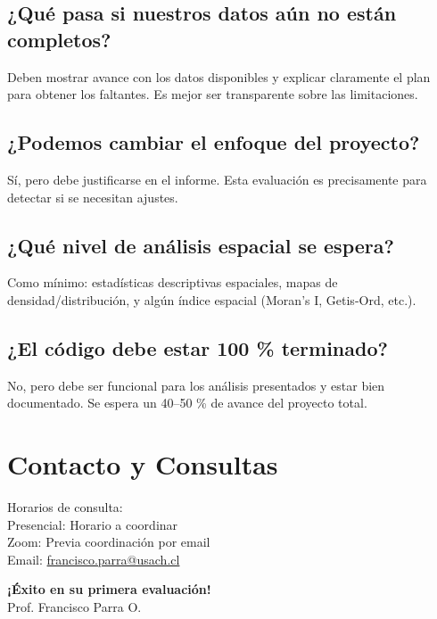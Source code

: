 \documentclass[11pt,a4paper]{article}
\begin{document}
\subsection{¿Qué pasa si nuestros datos aún no están completos?}
Deben mostrar avance con los datos disponibles y explicar claramente el plan para obtener los faltantes. Es mejor ser transparente sobre las limitaciones.

\subsection{¿Podemos cambiar el enfoque del proyecto?}
Sí, pero debe justificarse en el informe. Esta evaluación es precisamente para detectar si se necesitan ajustes.

\subsection{¿Qué nivel de análisis espacial se espera?}
Como mínimo: estadísticas descriptivas espaciales, mapas de densidad/distribución, y algún índice espacial (Moran's I, Getis-Ord, etc.).

\subsection{¿El código debe estar 100 \% terminado?}
No, pero debe ser funcional para los análisis presentados y estar bien documentado. Se espera un 40--50 \% de avance del proyecto total.

\section{Contacto y Consultas}
Horarios de consulta:\\
Presencial: Horario a coordinar\\
Zoom: Previa coordinación por email\\
Email: \href{mailto:francisco.parra@usach.cl}{francisco.parra@usach.cl}

\vfill
\begin{center}
\textbf{¡Éxito en su primera evaluación!}\\
Prof. Francisco Parra O.
\end{center}
\end{document}
